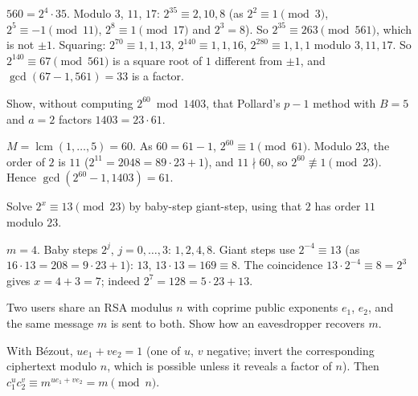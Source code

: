 \begin{solution}
$560 = 2^4 \cdot 35$. Modulo $3$, $11$, $17$: $2^{35} \equiv 2, 10, 8$ (as $2^2 \equiv 1 \pmod 3$, $2^5 \equiv -1 \pmod{11}$, $2^8 \equiv 1 \pmod{17}$ and $2^3 = 8$). So $2^{35} \equiv 263 \pmod{561}$, which is not $\pm1$.
Squaring: $2^{70} \equiv 1, 1, 13$, $2^{140} \equiv 1, 1, 16$, $2^{280} \equiv 1, 1, 1$ modulo $3, 11, 17$. So $2^{140} \equiv 67 \pmod{561}$ is a square root of $1$ different from $\pm1$, and $\gcd(67 - 1, 561) = 33$ is a factor.
\end{solution}

\begin{exercise}\label{cryptography:exercise-pollard}
Show, without computing $2^{60} \bmod 1403$, that Pollard's $p - 1$ method with $B = 5$ and $a = 2$ factors $1403 = 23 \cdot 61$.
\end{exercise}

\begin{solution}
$M = \operatorname{lcm}(1, \dots, 5) = 60$. As $60 = 61 - 1$, $2^{60} \equiv 1 \pmod{61}$. Modulo $23$, the order of $2$ is $11$ ($2^{11} = 2048 = 89 \cdot 23 + 1$), and $11 \nmid 60$, so $2^{60} \not\equiv 1 \pmod{23}$. Hence
$\gcd(2^{60} - 1, 1403) = 61$.
\end{solution}

\begin{exercise}\label{cryptography:exercise-bsgs}
Solve $2^x \equiv 13 \pmod{23}$ by baby-step giant-step, using that $2$ has order $11$ modulo $23$.
\end{exercise}

\begin{solution}
$m = 4$. Baby steps $2^j$, $j = 0, \dots, 3$: $1, 2, 4, 8$. Giant steps use $2^{-4} \equiv 13$ (as $16 \cdot 13 = 208 = 9 \cdot 23 + 1$): $13$, $13 \cdot 13 = 169 \equiv 8$. The coincidence $13 \cdot 2^{-4} \equiv 8 = 2^3$
gives $x = 4 + 3 = 7$; indeed $2^7 = 128 = 5 \cdot 23 + 13$.
\end{solution}

\begin{exercise}\label{cryptography:exercise-common-modulus}
Two users share an RSA modulus $n$ with coprime public exponents $e_1$, $e_2$, and the same message $m$ is sent to both. Show how an eavesdropper recovers $m$.
\end{exercise}

\begin{solution}
With Bézout, $ue_1 + ve_2 = 1$ (one of $u$, $v$ negative; invert the corresponding ciphertext modulo $n$, which is possible unless it reveals a factor of $n$). Then
$c_1^uc_2^v \equiv m^{ue_1 + ve_2} = m \pmod n$.
\end{solution}
